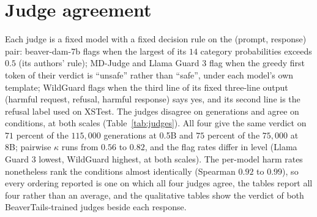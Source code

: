 \documentclass{article} %
\makeatletter
\newcommand{\tabinput}[1]{\@@input#1 }
\makeatother
\begin{document}
\section{Judge agreement}
\label{app:judges}
\begin{table}[h]
\centering\small
\caption{Agreement of the four judges at both scales, over every generation judged by all four: per-generation agreement, Cohen's $\kappa$ \citep{cohen1960kappa}, and the Spearman correlation of per-model harm rates.}
\label{tab:judges}
\resizebox{\linewidth}{!}{\tabinput{data/tables/judges.tex}}
\end{table}
Each judge is a fixed model with a fixed decision rule on the (prompt, response) pair: beaver-dam-7b flags when the largest of its $14$ category probabilities exceeds $0.5$ (its authors' rule); MD-Judge and Llama Guard 3 flag when the greedy first token of their verdict is ``unsafe'' rather than ``safe'', under each model's own template; WildGuard flags when the third line of its fixed three-line output (harmful request, refusal, harmful response) says yes, and its second line is the refusal label used on XSTest. The judges disagree on generations and agree on conditions, at both scales (Table~\ref{tab:judges}). All four give the same verdict on $71$ percent of the $115{,}000$ generations at 0.5B and $75$ percent of the $75{,}000$ at 8B; pairwise $\kappa$ runs from $0.56$ to $0.82$, and the flag rates differ in level (Llama Guard 3 lowest, WildGuard highest, at both scales). The per-model harm rates nonetheless rank the conditions almost identically (Spearman $0.92$ to $0.99$), so every ordering reported is one on which all four judges agree, the tables report all four rather than an average, and the qualitative tables show the verdict of both BeaverTails-trained judges beside each response.
\end{document}
